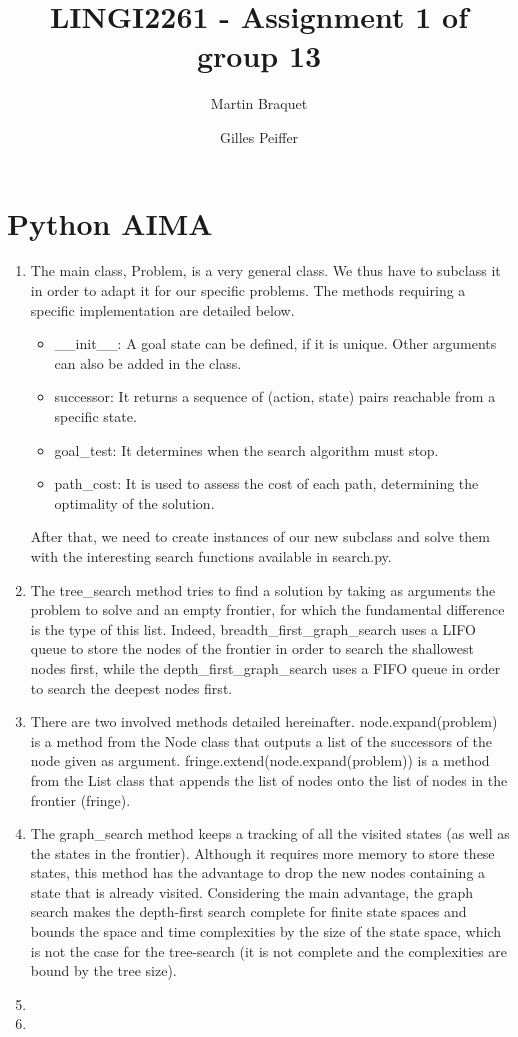 \documentclass[a4paper,10pt]{article}
\title{LINGI2261 - Assignment 1 of group 13}
\author{Martin Braquet \and Gilles Peiffer}
\begin{document}
\maketitle

\section{Python AIMA}

\begin{enumerate}
 \item The main class, Problem, is a very general class. We thus have to subclass it in order to adapt it for our specific problems. The methods requiring a specific implementation are detailed below.
 
 \begin{itemize}
  \item \_\_init\_\_: A goal state can be defined, if it is unique. Other arguments can also be added in the class.
  \item successor: It returns a sequence of (action, state) pairs reachable from a specific state.
  \item goal\_test: It determines when the search algorithm must stop.
  \item path\_cost: It is used to assess the cost of each path, determining the optimality of the solution.
 \end{itemize}
 After that, we need to create instances of our new subclass and solve them with the interesting search functions available in search.py.
 \item The tree\_search method tries to find a solution by taking as arguments the problem to solve and an empty frontier, for which the fundamental difference is the type of this list. Indeed, breadth\_first\_graph\_search uses a LIFO queue to store the nodes of the frontier in order to search the shallowest nodes first, while the depth\_first\_graph\_search uses a FIFO queue in order to search the deepest nodes first.
 \item There are two involved methods detailed hereinafter. node.expand(problem) is a method from the Node class that outputs a list of the successors of the node given as argument. fringe.extend(node.expand(problem)) is a method from the List class that appends the list of nodes onto the list of nodes in the frontier (fringe).
 \item The graph\_search method keeps a tracking of all the visited states (as well as the states in the frontier). Although it requires more memory to store these states, this method has the advantage to drop the new nodes containing a state that is already visited. Considering the main advantage, the graph search makes the depth-first search complete for finite state spaces and bounds the space and time complexities by the size of the state space, which is not the case for the tree-search (it is not complete and the complexities are bound by the tree size).
 \item %
 \item %
\end{enumerate}
\end{document}
